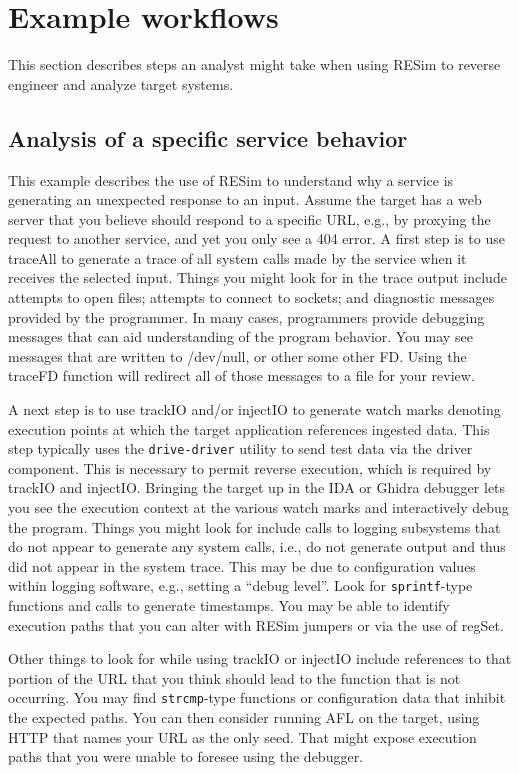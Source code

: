 \documentclass[titlepage]{article}
\begin{document}
\section{Example workflows}
\label{example-workflows}
This section describes steps an analyst might take when using RESim to reverse engineer and analyze target systems.

\subsection{Analysis of a specific service behavior}
This example describes the use of RESim to understand why a service is generating an unexpected response to an input.  Assume the target has
a web server that you believe should respond to a specific URL, e.g., by proxying the request to another service, and yet you only see a 404 error.
A first step is to use traceAll to generate a trace of all system calls made by the service when it receives the selected input.  Things you might
look for in the trace output include attempts to open files; attempts to connect to sockets; and diagnostic messages provided by the programmer.
In many cases, programmers provide debugging messages that can aid understanding of the program behavior.  You may see messages that are written
to /dev/null, or other some other FD.  Using the traceFD function will redirect all of those messages to a file for your review.  

A next step is to use trackIO and/or injectIO to generate watch marks denoting execution points at which the target application references
ingested data.  This step typically uses the {\tt drive-driver} utility to send test data via the driver component.  This is necessary to 
permit reverse execution, which is required by trackIO and injectIO.  Bringing the target up in the IDA or Ghidra debugger lets you see the execution
context at the various watch marks and interactively debug the program.  Things you might look for include calls to logging subsystems that do
not appear to generate any system calls, i.e., do not generate output and thus did not appear in the system trace.  This may be due to configuration 
values within logging software, e.g., setting a ``debug level''.  Look for {\tt sprintf}-type functions
and calls to generate timestamps.  You may be able to identify execution paths that you can alter with RESim jumpers or via the use of regSet.

Other things to look for while using trackIO or injectIO include references to that portion of the URL that you think should lead to the function that is
not occurring.  You may find {\tt strcmp}-type functions or configuration data that inhibit the expected paths.  You can then consider running AFL on the
target, using HTTP that names your URL as the only seed.  That might expose execution paths that you were unable to foresee using the debugger.
\end{document}
